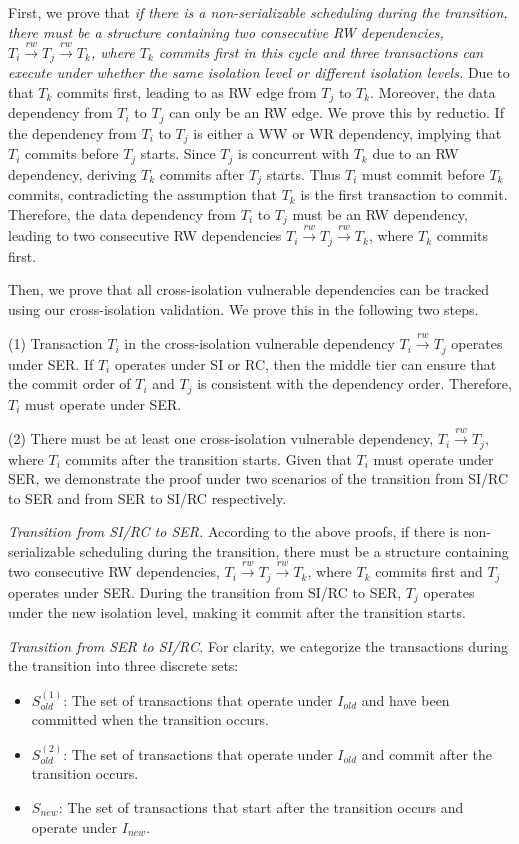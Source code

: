 {
\color{blue}
First, we prove that \textit{if there is a non-serializable scheduling during the transition, there must be a structure containing two consecutive RW dependencies, $T_i \xrightarrow{rw} T_j \xrightarrow{rw} T_k$, where $T_k$ commits first in this cycle and three transactions can execute under whether the same isolation level or different isolation levels.} Due to that $T_k$ commits first, leading to as RW edge from $T_j$ to $T_k$. Moreover, the data dependency from $T_i$ to $T_j$ can only be an RW edge. We prove this by reductio. If the dependency from $T_i$ to $T_j$ is either a WW or WR dependency, implying that $T_i$ commits before $T_j$ starts. Since $T_j$ is concurrent with $T_k$ due to an RW dependency, deriving $T_k$ commits after $T_j$ starts. Thus $T_i$ must commit before $T_k$ commits, contradicting the assumption that $T_k$ is the first transaction to commit. Therefore, the data dependency from $T_i$ to $T_j$ must be an RW dependency, leading to two consecutive RW dependencies $T_i \xrightarrow{rw} T_j \xrightarrow{rw} T_k$, where $T_k$ commits first.

Then, we prove that all cross-isolation vulnerable dependencies can be tracked using our cross-isolation validation. We prove this in the following two steps.

(1) Transaction $T_i$ in the cross-isolation vulnerable dependency $T_i \xrightarrow{rw} T_j$ operates under SER. If $T_i$ operates under SI or RC, then the middle tier can ensure that the commit order of $T_i$ and $T_j$ is consistent with the dependency order. Therefore, $T_i$ must operate under SER.


(2) There must be at least one cross-isolation vulnerable dependency, $T_i \xrightarrow{rw} T_j$, where $T_i$ commits after the transition starts. Given that $T_i$ must operate under SER, we demonstrate the proof under two scenarios of the transition from SI/RC to SER and from SER to SI/RC respectively. 

\textit{Transition from SI/RC to SER.} According to the above proofs, if there is non-serializable scheduling during the transition, there must be a structure containing two consecutive RW dependencies, $T_i \xrightarrow{rw} T_j \xrightarrow{rw} T_k$, where $T_k$ commits first and $T_j$ operates under SER. During the transition from SI/RC to SER, $T_j$ operates under the new isolation level, making it commit after the transition starts. 

\textit{Transition from SER to SI/RC.} For clarity, we categorize the transactions during the transition into three discrete sets:
\begin{itemize}[leftmargin=*]
    \item $S_{old}^{(1)}$: The set of transactions that operate under $I_{old}$ and have been committed when the transition occurs. 
    \item $S_{old}^{(2)}$: The set of transactions that operate under $I_{old}$ and commit after the transition occurs. 
    \item $S_{new}$: The set of transactions that start after the transition occurs and operate under $I_{new}$.
\end{itemize} 

}
